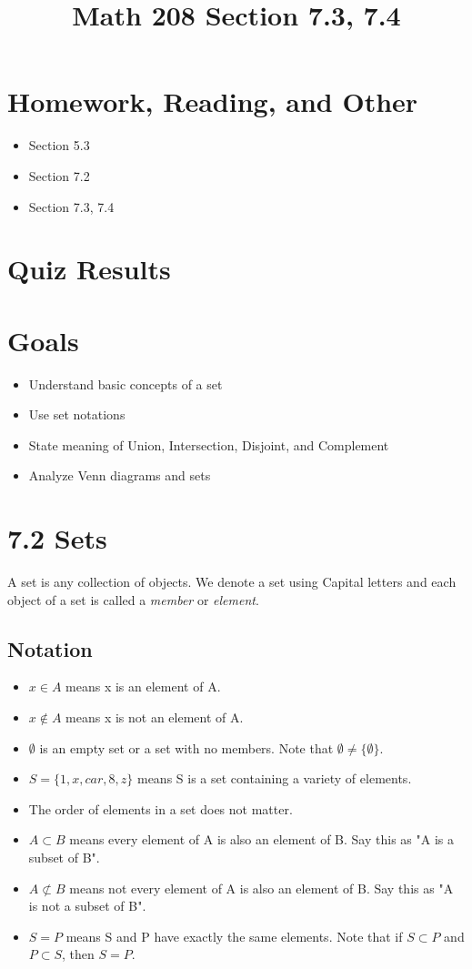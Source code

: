 \documentclass[14pt]{extarticle}
\title{\vspace{-5ex}Math 208 Section 7.3, 7.4}
\date{\vspace{-10ex}}
\begin{document}
\maketitle		
\section*{Homework, Reading, and Other}
\begin{itemize}
	\item Section 5.3
	\item Section 7.2
	\item Section 7.3, 7.4
\end{itemize}

\section*{Quiz Results}

\section*{Goals}
\begin{itemize}
	\item Understand basic concepts of a set
	\item Use set notations
	\item State meaning of Union, Intersection, Disjoint, and Complement
	\item Analyze Venn diagrams and sets
\end{itemize}

\section*{7.2 Sets}
A set is any collection of objects. We denote a set using Capital letters and each object of a set is called a \textit{member} or \textit{element}.

\subsection{Notation}
\begin{itemize}
	\item $x \in A$ means x is an element of A.
	\item $x \notin A$ means x is not an element of A.
	\item $\emptyset$ is an empty set or a set with no members. Note that $\emptyset \neq \{\emptyset\}$.
	\item $S = \{1,x,car,8,z\}$ means S is a set containing a variety of elements.
	\item The order of elements in a set does not matter.
	\item $A \subset B$ means every element of A is also an element of B. Say this as "A is a subset of B". 
	\item $A \not\subset B$ means not every element of A is also an element of B. Say this as "A is not a subset of B".
	\item $S = P$ means S and P have exactly the same elements. Note that if $S \subset P$ and $P \subset S$, then $S = P$.
\end{itemize}
	
\end{document}
